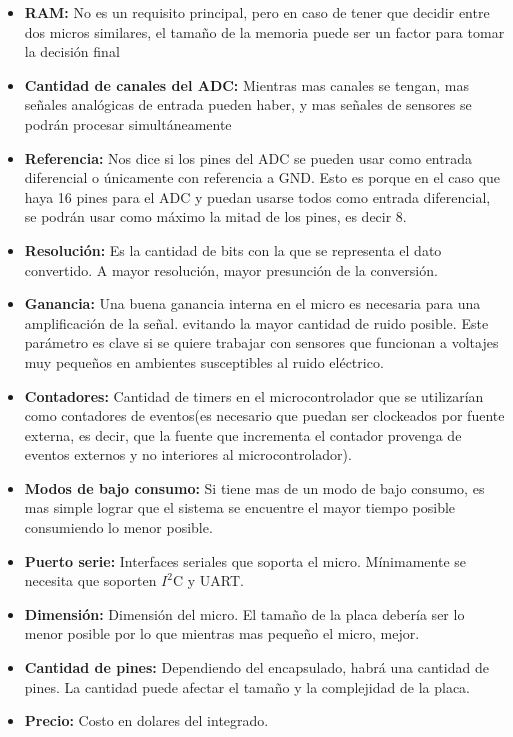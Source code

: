 \begin{itemize}
  \item \textbf{RAM:} No es un requisito principal, pero en caso de tener que decidir entre dos micros similares, el tamaño de la memoria puede ser un factor para tomar la decisión final
  \item \textbf{Cantidad de canales del ADC:} Mientras mas canales se tengan, mas señales analógicas de entrada pueden haber, y mas señales de sensores se podrán procesar simultáneamente
  \item \textbf{Referencia:} Nos dice si los pines del ADC se pueden usar como entrada diferencial o \'unicamente con referencia a GND. Esto es porque en el caso que haya 16 pines para el ADC y puedan usarse todos como entrada diferencial, se podrán usar como máximo la mitad de los pines, es decir 8.
  \item \textbf{Resolución:} Es la cantidad de bits con la que se representa el dato convertido. A mayor resolución, mayor presunción de la conversión.
  \item \textbf{Ganancia:} Una buena ganancia interna en el micro es necesaria para una amplificación de la señal.  evitando la mayor cantidad de ruido posible. Este parámetro es clave si se quiere trabajar con sensores que funcionan a voltajes muy pequeños en ambientes susceptibles al ruido el\'ectrico.
  \item \textbf{Contadores:} Cantidad de timers en el microcontrolador que se utilizar\'ian como contadores de eventos(es necesario que puedan ser clockeados por fuente externa, es decir, que la fuente que incrementa el contador provenga de eventos externos y no interiores al microcontrolador).
  \item \textbf{Modos de bajo consumo:} Si tiene mas de un modo de bajo consumo, es mas simple lograr que el sistema se encuentre el mayor tiempo posible consumiendo lo menor posible.
  \item \textbf{Puerto serie:} Interfaces seriales que soporta el micro. M\'inimamente se necesita que soporten $I^{2}$C y UART.
  \item \textbf{Dimensión:} Dimensión del micro. El tamaño de la placa deber\'ia ser lo menor posible por lo que mientras mas pequeño el micro, mejor.
  \item \textbf{Cantidad de pines:} Dependiendo del encapsulado, habrá una cantidad de pines. La cantidad puede afectar el tamaño y la complejidad de la placa.
  \item \textbf{Precio:} Costo en dolares del integrado.
\end{itemize}

